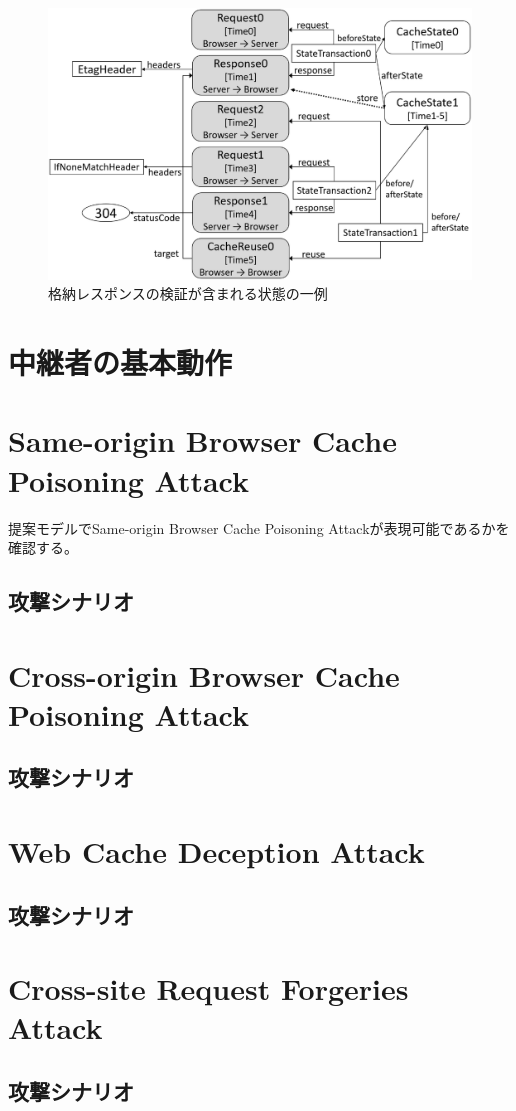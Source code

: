 \documentclass[12pt,a4paper]{jbook}
\begin{document}
\begin{figure}[htb]
\centering
\includegraphics[width=450pt]{./fig/TestVerification.eps}
\caption{格納レスポンスの検証が含まれる状態の一例}
\label{fig:TestVerification}
\end{figure}

\section{中継者の基本動作}

\section{Same-origin Browser Cache Poisoning Attack}
提案モデルでSame-origin Browser Cache Poisoning Attack\cite{bcpattack}が表現可能であるかを確認する。

\subsection{攻撃シナリオ}


\section{Cross-origin Browser Cache Poisoning Attack}
\subsection{攻撃シナリオ}


\section{Web Cache Deception Attack}
\subsection{攻撃シナリオ}


\section{Cross-site Request Forgeries Attack}
\subsection{攻撃シナリオ}
\end{document}
